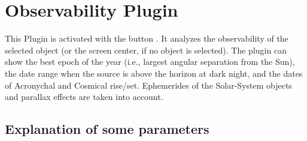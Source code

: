 
\newpage
\section{Observability Plugin}
\label{sec:plugins:Observability}

This Plugin is activated with the button . 
It analyzes the observability of the selected object (or the
screen center, if no object is selected). The plugin can show 
the best epoch of the year (i.e.,
largest angular separation from the Sun), the date range when the
source is above the horizon at dark night, and the dates of Acronychal
and Cosmical rise/set.  Ephemerides of the Solar-System objects and
parallax effects are taken into account.

\subsection*{Explanation of some parameters}

